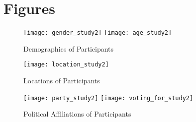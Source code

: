 \chapter{Figures}

\vspace*{-3in}
\newpage

\begin{figure}[h!] 
\centering 
  \texttt{[image: gender\_study2]} 
  \texttt{[image: age\_study2]} 
  \caption{Demographics of Participants
    \label{fig:demographics2}}
\end{figure}

\begin{figure}[h!]  
\centering  
  \texttt{[image: location\_study2]} 
  \caption{Locations of Participants
    \label{fig:locations2}}
\end{figure}

\begin{figure}[h!]  
\centering 
  \texttt{[image: party\_study2]} 
  \texttt{[image: voting\_for\_study2]} 
  \caption{Political Affiliations of Participants
    \label{fig:political2}}
\end{figure}


%  